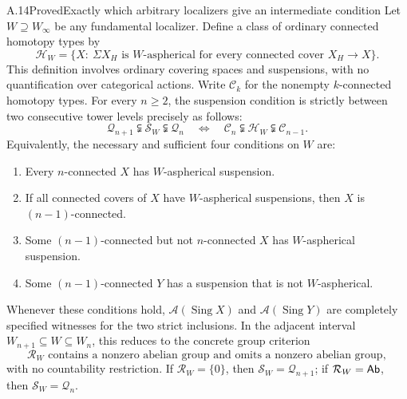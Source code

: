\begin{claim}{A.14}{Proved}{Exactly which arbitrary localizers give an intermediate condition}\label{A:global-intermediate}
Let $W\supseteq W_\infty$ be any fundamental localizer. Define a class of ordinary connected homotopy types by
\[
 \mathscr H_W=
 \{X:\ \Sigma X_H\text{ is }W\text{-aspherical for every connected cover }
 X_H\to X\}.
\]
This definition involves ordinary covering spaces and suspensions, with no quantification over categorical actions. Write $\mathscr C_k$ for the nonempty $k$-connected homotopy types. For every $n\geq2$, the suspension condition is strictly between two consecutive tower levels precisely as follows:
\[
 \mathcal Q_{n+1}\subsetneqq\mathcal S_W\subsetneqq\mathcal Q_n
 \quad\Longleftrightarrow\quad
 \mathscr C_n\subsetneqq\mathscr H_W\subsetneqq\mathscr C_{n-1}.
 \tag{A.14.1}
\]
Equivalently, the necessary and sufficient four conditions on $W$ are:
\begin{enumerate}
\item Every $n$-connected $X$ has $W$-aspherical suspension.
\item If all connected covers of $X$ have $W$-aspherical suspensions, then $X$ is $(n-1)$-connected.
\item Some $(n-1)$-connected but not $n$-connected $X$ has $W$-aspherical suspension.
\item Some $(n-1)$-connected $Y$ has a suspension that is not $W$-aspherical.
\end{enumerate}
Whenever these conditions hold, $\mathcal A(\operatorname{Sing}X)$ and $\mathcal A(\operatorname{Sing}Y)$ are completely specified witnesses for the two strict inclusions. In the adjacent interval $W_{n+1}\subseteq W\subseteq W_n$, this reduces to the concrete group criterion
\[
 \mathcal R_W\text{ contains a nonzero abelian group and omits a nonzero abelian group},
\]
with no countability restriction. If $\mathcal R_W=\{0\}$, then $\mathcal S_W=\mathcal Q_{n+1}$; if $\mathcal R_W=\mathsf{Ab}$, then $\mathcal S_W=\mathcal Q_n$.
\end{claim}
